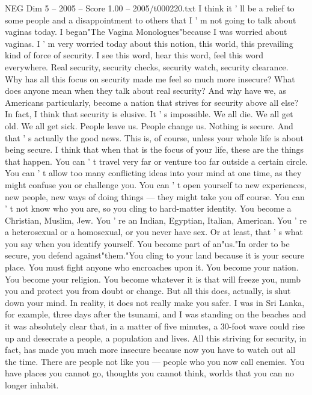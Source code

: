 \begin{textsample}{NEG Dim 5 – 2005 – Score 1.00 – 2005/t000220.txt}  \label{ex:f5_neg_073}
I think it ' ll be a relief to some people and a disappointment to others that I ' m not going to talk about vaginas today.
I began"The Vagina Monologues"because I was worried about vaginas.
I ' m very worried today about this notion, this world, this prevailing kind of force of security.
I see this word, hear this word, feel this word everywhere.
Real security, security checks, security watch, security clearance.
Why has all this focus on security made me feel so much more insecure?
What does anyone mean when they talk about real security?
And why have we, as Americans particularly, become a nation that strives for security above all else?
In fact, I think that security is elusive.
It ' s impossible.
We all die.
We all get old.
We all get sick.
People leave us.
People change us.
Nothing is secure.
And that ' s actually the good news.
This is, of course, unless your whole life is about being secure.
I think that when that is the focus of your life, these are the things that happen.
You can ' t travel very far or venture too far outside a certain circle.
You can ' t allow too many conflicting ideas into your mind at one time, as they might confuse you or challenge you.
You can ' t open yourself to new experiences, new people, new ways of doing things — they might take you off course.
You can ' t not know who you are, so you cling to hard-matter identity.
You become a Christian, Muslim, Jew.
You ' re an Indian, Egyptian, Italian, American.
You ' re a heterosexual or a homosexual, or you never have sex.
Or at least, that ' s what you say when you identify yourself.
You become part of an"us."In order to be secure, you defend against"them."You cling to your land because it is your secure place.
You must fight anyone who encroaches upon it.
You become your nation.
You become your religion.
You become whatever it is that will freeze you, numb you and protect you from doubt or change.
But all this does, actually, is shut down your mind.
In reality, it does not really make you safer.
I was in Sri Lanka, for example, three days after the tsunami, and I was standing on the beaches and it was absolutely clear that, in a matter of five minutes, a 30-foot wave could rise up and desecrate a people, a population and lives.
All this striving for security, in fact, has made you much more insecure because now you have to watch out all the time.
There are people not like you — people who you now call enemies.
You have places you cannot go, thoughts you cannot think, worlds that you can no longer inhabit.

\end{textsample}
